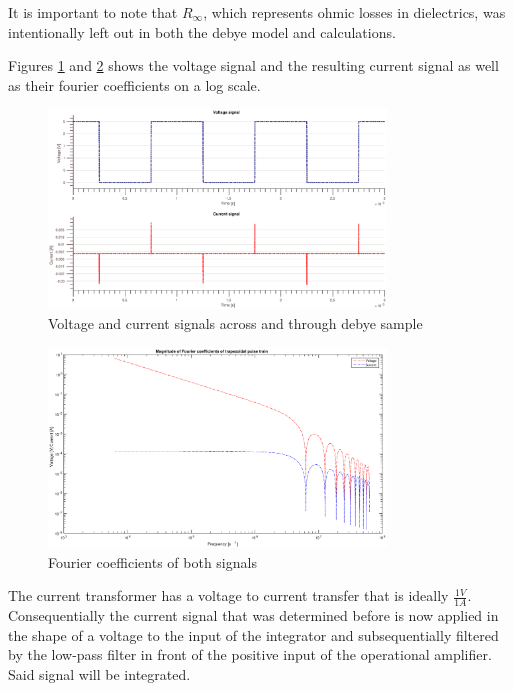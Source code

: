 It is important to note that $R_{\infty}$, which represents
ohmic losses in dielectrics, was intentionally left out in both the debye model and calculations.

Figures \ref{fig.beforeandafter} and \ref{fig.fourierla} shows the voltage signal and the resulting current signal as well as their fourier coefficients on a log scale.

\begin{figure}[h!tb]
\centerline{\includegraphics[width=0.8\textwidth]{figures/Method/signal_simulation/beforeandafter.eps}}
\caption{Voltage and current signals across and through debye sample}
\label{fig.beforeandafter}
\end{figure}

\begin{figure}[h!tb]
\centerline{\includegraphics[width=0.8\textwidth]{figures/Method/signal_simulation/fourierla.eps}}
\caption{Fourier coefficients of both signals}
\label{fig.fourierla}
\end{figure}

The current transformer has a voltage to current transfer that is ideally $\frac{1V}{1A}$. 
Consequentially the current signal that was determined before is now applied in the shape of a voltage to the input of the integrator and subsequentially
filtered by the low-pass filter in front of the positive input of the operational amplifier. Said signal will be integrated.


